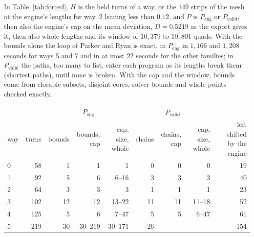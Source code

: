 \documentclass[11pt,a4paper]{article}
\newenvironment{evidence}[3][]{}{}
\begin{document}
In Table~\ref{tab:forced}, $H$ is the held turns of a way, or the $149$
strips of the mesh at the engine's lengths for way~2 leaning less than
$0.12$, and $P$ is $P_{\mathrm{eng}}$ or $P_{\mathrm{valid}}$, then also the engine's cap on the mean
deviation, $D = 0.5219$ as the export gives it, then also whole lengths and
its window of $10{,}379$ to $10{,}801$ quads. With the bounds alone the
loop of Parker and Ryan is exact, in $P_{\mathrm{eng}}$ in $1{,}166$ and
$1{,}208$ seconds for ways 5 and 7 and in at most $22$ seconds for the other
families; in $P_{\mathrm{valid}}$ the paths, too many to list, enter each
program as its lengths break them (shortest paths), until none is broken.
With the cap and the window, bounds come from closable subsets, disjoint
cores, solver bounds and whole points checked exactly.

\begin{table}[t]
\begin{evidence}[unbreakable]{data}{the column ``bounds'' of $P_{\mathrm{eng}}$ in ways 0 to 4 and 6, exact on the export these numbers come from (\texttt{make lean-check}); in ways 5 and 7 Lean certifies only $20 \le \tau \le 30$ and $28 \le \tau \le 37$, and the row of the strips is not checked by Lean; the columns of $P_{\mathrm{valid}}$ and those with the cap and the window are measured, not checked}
\centering
\small
\begin{tabular}{lrrrrrrrr}
\toprule
& & \multicolumn{3}{c}{$P_{\mathrm{eng}}$} & \multicolumn{3}{c}{$P_{\mathrm{valid}}$} & \\
\cmidrule(lr){3-5}\cmidrule(lr){6-8}
way & turns & bounds & \shortstack[r]{bounds,\\ cap} & \shortstack[r]{cap, size,\\ whole} & chains & \shortstack[r]{chains,\\ cap} & \shortstack[r]{cap, size,\\ whole} & \shortstack[r]{left shifted\\ by the engine} \\
\midrule
0 & 58 & 1 & 1 & 1 & 0 & 0 & 0 & 19 \\
1 & 92 & 5 & 6 & 6--16 & 3 & 3 & 3 & 40 \\
2 & 64 & 3 & 3 & 3 & 1 & 1 & 1 & 23 \\
3 & 102 & 12 & 12 & 13--22 & 11 & 11 & 11--18 & 52 \\
4 & 125 & 5 & 6 & 7--47 & 5 & 5 & 6--47 & 61 \\
5 & 219 & 30 & 30--219 & 30--171 & 26 & -- & -- & 154 \\

\end{tabular}
\end{evidence}
\end{table}
\end{document}
